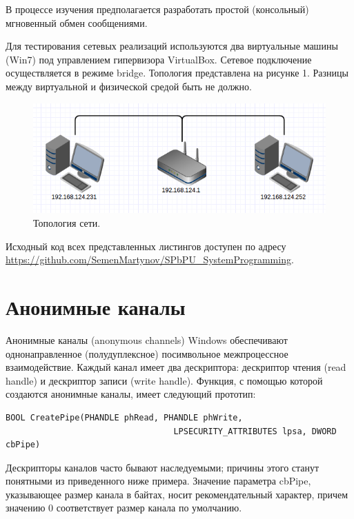 \documentclass[a4paper,12pt]{article} %
\begin{document}
В процессе изучения предполагается разработать простой (консольный) мгновенный обмен сообщениями.

Для тестирования сетевых реализаций используются два виртуальные машины (Win7) под управлением гипервизора VirtualBox. Сетевое подключение осуществляется в режиме bridge. Топология представлена на рисунке 1. Разницы между виртуальной и физической средой быть не должно.

\begin{figure}[h!]
\centering
\includegraphics[scale=0.7]{img/01_topology}
\caption{Топология сети.}
\end{figure}

\vspace{1em}
Исходный код всех представленных листингов доступен по адресу \\ \url{https://github.com/SemenMartynov/SPbPU_SystemProgramming}.

\setcounter{page}{2}

\newpage
\section*{Анонимные каналы}

Анонимные каналы (anonymous channels) Windows обеспечивают однонаправленное (полудуплексное) посимвольное межпроцессное взаимодействие. Каждый канал имеет два дескриптора: дескриптор чтения (read handle) и дескриптор записи (write handle). Функция, с помощью которой создаются анонимные каналы, имеет следующий прототип:

\begin{verbatim}
BOOL CreatePipe(PHANDLE phRead, PHANDLE phWrite,
                                  LPSECURITY_ATTRIBUTES lpsa, DWORD cbPipe)
\end{verbatim}

Дескрипторы каналов часто бывают наследуемыми; причины этого станут понятными из приведенного ниже примера. Значение параметра cbPipe, указывающее размер канала в байтах, носит рекомендательный характер, причем значению 0 соответствует размер канала по умолчанию.
\end{document}
